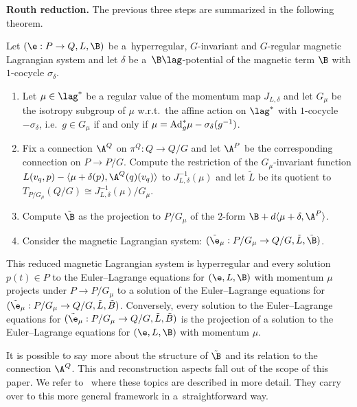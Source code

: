 {\bf Routh reduction.} The previous three steps are summarized in the following theorem.
\begin{theorem}\label{thm:routh}
  Let $(\e:P\to Q,L,\B)$ be a~hyperregular, $G$-invariant and $G$-regular magnetic Lagrangian system and let $\delta$ be a~$\B\lag$-potential of the magnetic term $\B$ with $1$-cocycle $\sigma_\delta$.
  \begin{enumerate}\itemsep=0pt
  \item[$1.$] Let $\mu\in\lag^*$ be a regular value of the momentum map $J_{L,\delta}$ and let $G_\mu$ be the isotropy subgroup of $\mu$ w.r.t.\ the affine action on $\lag^*$ with $1$-cocycle $-\sigma_\delta$, i.e.\ $g\in G_\mu$ if and only if $\mu = {\rm Ad}^*_g\mu -\sigma_\delta(g^{-1})$.
  \item[$2.$] Fix a connection $\A^Q$ on $\pi^Q:Q\to Q/G$ and let $\A^P$ be the corresponding connection on $P\to P/G$. Compute the restriction of the $G_\mu$-invariant function $L(v_q,p)-\langle \mu+\delta(p),\A^Q(q)(v_q)\rangle$ to  $J^{-1}_{L,\delta}(\mu)$ and let $\tilde L$ be its quotient  to $T_{P/G_\mu}(Q/G) \cong J^{-1}_{L,\delta}(\mu)/G_\mu$.
 \item[$3.$] Compute $\tilde\B$ as the projection to $P/G_\mu$ of the $2$-form $\B+d\langle \mu+\delta,\A^P\rangle$.
\item[$4.$]  Consider the magnetic Lagrangian system: $(\tilde\e_\mu:P/G_\mu \to Q/G, \tilde L, \tilde \B)$.
 \end{enumerate}

 This reduced magnetic Lagrangian system is hyperregular and every solution $p(t)\in P$ to the Euler--Lagrange equations for $(\e,L,\B)$ with momentum $\mu$ projects under $P\to P/G_\mu$ to a solution of the Euler--Lagrange equations for $(\tilde\e_\mu:P/G_\mu \to Q/G, \tilde L, \tilde B)$. Conversely, every solution to the Euler--Lagrange equations for $(\tilde\e_\mu:P/G_\mu \to Q/G,\tilde L, \tilde B)$ is the projection of a solution to the Euler--Lagrange equations for $(\e,L,\B)$ with momentum $\mu$.
\end{theorem}

It is possible to say more about the structure of $\tilde \B$ and its relation to the connection $\A^Q$.  This and reconstruction aspects fall out of the scope of this paper. We refer to~\cite{BM} where these topics are described in more detail. They carry over to this more general framework in a~straightforward way.


